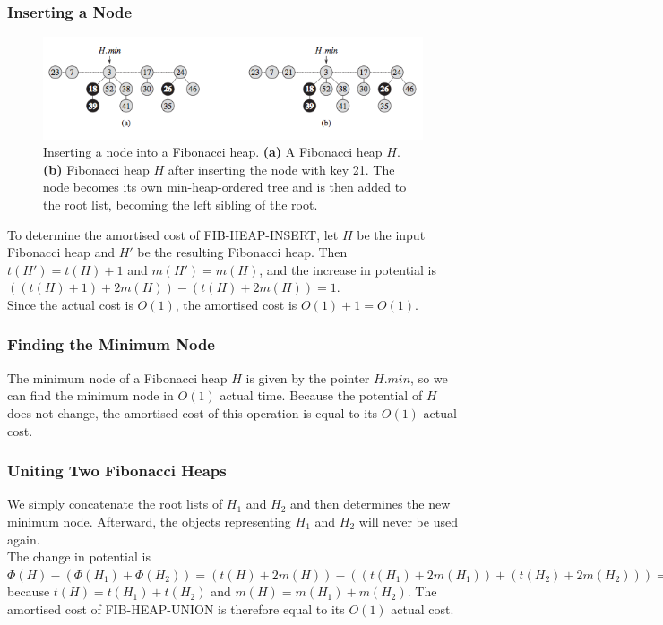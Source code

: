 \documentclass[12pt]{article}
\begin{document}
\subsubsection{Inserting a Node}
\begin{figure} [H]
    \begin{center}
        \includegraphics[width=\textwidth]{Images/InsertFib.png}
        \caption{\footnotesize{Inserting a node into a Fibonacci heap. \textbf{(a)} A Fibonacci heap $H$. \textbf{(b)} Fibonacci heap $H$ after inserting the node with key 21. The node becomes its own min-heap-ordered tree and is then added to the root list, becoming the left sibling of the root.}}
    \end{center}
\end{figure}

To determine the amortised cost of FIB-HEAP-INSERT, let $H$ be the input Fibonacci heap and $H'$ be the resulting Fibonacci heap. Then $t(H') = t(H) + 1$ and $m(H') = m(H)$, and the increase in potential is $((t(H) + 1) + 2m(H)) - (t(H) + 2m(H)) = 1$. \\

Since the actual cost is $O(1)$, the amortised cost is $O(1) + 1 = O(1)$.
%
\subsubsection{Finding the Minimum Node}
The minimum node of a Fibonacci heap $H$ is given by the pointer $H.min$, so we can find the minimum node in $O(1)$ actual time. Because the potential of $H$ does not change, the amortised cost of this operation is equal to its $O(1)$ actual cost. 
%
\subsubsection{Uniting Two Fibonacci Heaps}
We simply concatenate the root lists of $H_1$ and $H_2$ and then determines the new minimum node. Afterward, the objects representing $H_1$ and $H_2$ will never be used again. \\

The change in potential is\\ $\Phi(H) - (\Phi(H_1) + \Phi(H_2)) = (t(H) + 2m(H)) - ((t(H_1) + 2m(H_1)) + (t(H_2) + 2m(H_2))) = 0$\\ because $t(H) = t(H_1) + t(H_2)$ and $m(H) = m(H_1) + m(H_2)$. The amortised cost of FIB-HEAP-UNION is therefore equal to its $O(1)$ actual cost. 
%
\end{document}
